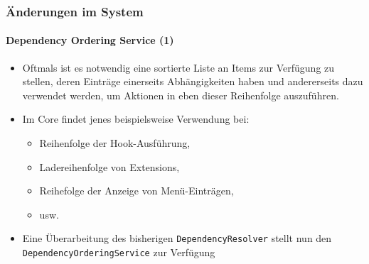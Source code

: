 \begin{frame}[fragile]
	\frametitle{Änderungen im System}
	\framesubtitle{Dependency Ordering Service (1)}

	\begin{itemize}

		\item Oftmals ist es notwendig eine sortierte Liste an Items zur Verfügung zu stellen,
			deren Einträge einerseits Abhängigkeiten haben und andererseits dazu verwendet werden,
			um Aktionen in eben dieser Reihenfolge auszuführen.

		\item Im Core findet jenes beispielsweise Verwendung bei:

			\begin{itemize}
				\item Reihenfolge der Hook-Ausführung,
				\item Ladereihenfolge von Extensions,
				\item Reihefolge der Anzeige von Menü-Einträgen,
				\item usw.
			\end{itemize}

		\item Eine Überarbeitung des bisherigen \texttt{DependencyResolver} stellt nun den
			\texttt{DependencyOrderingService} zur Verfügung

	\end{itemize}

\end{frame}


